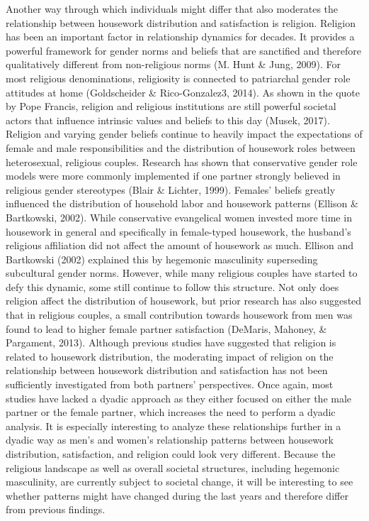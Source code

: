 \documentclass[
  man,floatsintext]{apa6}
\begin{document}
Another way through which individuals might differ that also moderates the relationship between housework distribution and satisfaction is religion. Religion has been an important factor in relationship dynamics for decades. It provides a powerful framework for gender norms and beliefs that are sanctified and therefore qualitatively different from non-religious norms (M. Hunt \& Jung, 2009). For most religious denominations, religiosity is connected to patriarchal gender role attitudes at home (Goldscheider \& Rico-Gonzalez3, 2014). As shown in the quote by Pope Francis, religion and religious institutions are still powerful societal actors that influence intrinsic values and beliefs to this day (Musek, 2017). Religion and varying gender beliefs continue to heavily impact the expectations of female and male responsibilities and the distribution of housework roles between heterosexual, religious couples. Research has shown that conservative gender role models were more commonly implemented if one partner strongly believed in religious gender stereotypes (Blair \& Lichter, 1999). Females' beliefs greatly influenced the distribution of household labor and housework patterns (Ellison \& Bartkowski, 2002). While conservative evangelical women invested more time in housework in general and specifically in female-typed housework, the husband's religious affiliation did not affect the amount of housework as much. Ellison and Bartkowski (2002) explained this by hegemonic masculinity superseding subcultural gender norms. However, while many religious couples have started to defy this dynamic, some still continue to follow this structure. Not only does religion affect the distribution of housework, but prior research has also suggested that in religious couples, a small contribution towards housework from men was found to lead to higher female partner satisfaction (DeMaris, Mahoney, \& Pargament, 2013). Although previous studies have suggested that religion is related to housework distribution, the moderating impact of religion on the relationship between housework distribution and satisfaction has not been sufficiently investigated from both partners' perspectives. Once again, most studies have lacked a dyadic approach as they either focused on either the male partner or the female partner, which increases the need to perform a dyadic analysis. It is especially interesting to analyze these relationships further in a dyadic way as men's and women's relationship patterns between housework distribution, satisfaction, and religion could look very different. Because the religious landscape as well as overall societal structures, including hegemonic masculinity, are currently subject to societal change, it will be interesting to see whether patterns might have changed during the last years and therefore differ from previous findings.
\end{document}
